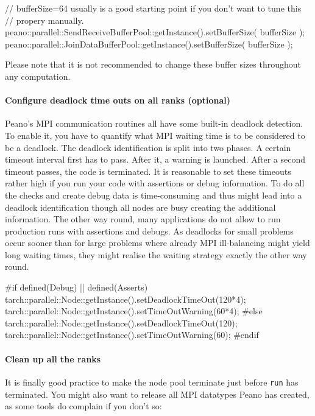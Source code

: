 \begin{code}
// bufferSize=64 usually is a good starting point if you don't want to tune this
// propery manually.
peano::parallel::SendReceiveBufferPool::getInstance().setBufferSize( bufferSize );
peano::parallel::JoinDataBufferPool::getInstance().setBufferSize( bufferSize );
\end{code}

\noindent
Please note that it is not recommended to change these buffer sizes throughout
any computation. 


\paragraph{Configure deadlock time outs on all ranks (optional)}
Peano's MPI communication routines all have some built-in deadlock detection. 
To enable it, you have to quantify what MPI waiting time is to be considered to
be a deadlock.
The deadlock identification is split into two phases.
A certain timeout interval first has to pass.
After it, a warning is launched. 
After a second timeout passes, the code is terminated.
It is reasonable to set these timeouts rather high if you run your code with
assertions or debug information.
To do all the checks and create debug data is time-consuming and thus might lead
into a deadlock identification though all nodes are busy creating the additional
information.
The other way round, many applications do not allow to run production runs with
assertions and debugs.
As deadlocks for small problems occur sooner than for large problems where
already MPI ill-balancing might yield long waiting times, they might realise the
waiting strategy exactly the other way round.

\begin{code}
  #if defined(Debug) || defined(Asserts)
  tarch::parallel::Node::getInstance().setDeadlockTimeOut(120*4);
  tarch::parallel::Node::getInstance().setTimeOutWarning(60*4);
  #else
  tarch::parallel::Node::getInstance().setDeadlockTimeOut(120);
  tarch::parallel::Node::getInstance().setTimeOutWarning(60);
  #endif
\end{code}

\paragraph{Clean up all the ranks}
It is finally good practice to make the node pool terminate just before
\texttt{run} has terminated.
You might also want to release all MPI datatypes Peano has created, as some
tools do complain if you don't so:

